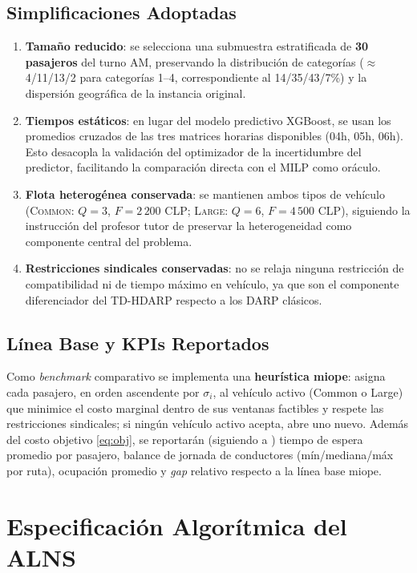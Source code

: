\subsection{Simplificaciones Adoptadas}
\begin{enumerate}
    \item \textbf{Tamaño reducido}: se selecciona una submuestra estratificada de \textbf{30 pasajeros} del turno AM, preservando la distribución de categorías ($\approx$4/11/13/2 para categorías 1--4, correspondiente al 14/35/43/7\%) y la dispersión geográfica de la instancia original.
    \item \textbf{Tiempos estáticos}: en lugar del modelo predictivo XGBoost, se usan los promedios cruzados de las tres matrices horarias disponibles (04h, 05h, 06h). Esto desacopla la validación del optimizador de la incertidumbre del predictor, facilitando la comparación directa con el MILP como oráculo.
    \item \textbf{Flota heterogénea conservada}: se mantienen ambos tipos de vehículo (\textsc{Common}: $Q=3$, $F=2\,200$ CLP; \textsc{Large}: $Q=6$, $F=4\,500$ CLP), siguiendo la instrucción del profesor tutor de preservar la heterogeneidad como componente central del problema.
    \item \textbf{Restricciones sindicales conservadas}: no se relaja ninguna restricción de compatibilidad ni de tiempo máximo en vehículo, ya que son el componente diferenciador del TD-HDARP respecto a los DARP clásicos.
\end{enumerate}

\subsection{Línea Base y KPIs Reportados}
Como \textit{benchmark} comparativo se implementa una \textbf{heurística miope}: asigna cada pasajero, en orden ascendente por $\sigma_i$, al vehículo activo (Common o Large) que minimice el costo marginal dentro de sus ventanas factibles y respete las restricciones sindicales; si ningún vehículo activo acepta, abre uno nuevo. Además del costo objetivo \eqref{eq:obj}, se reportarán (siguiendo a \cite{Pilati2025}) tiempo de espera promedio por pasajero, balance de jornada de conductores (mín/mediana/máx por ruta), ocupación promedio y \textit{gap} relativo respecto a la línea base miope.

\section{Especificación Algorítmica del ALNS}
\label{sec:alns}

